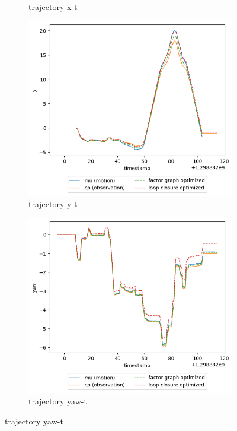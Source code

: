 \documentclass[conference]{IEEEtran}
\begin{document}
\begin{figure}
\begin{subfigure}{0.24\textwidth}
        \caption{trajectory x-t}
        \label{fig:trj_21_x}
    \end{subfigure}
    \hfill
    \begin{subfigure}{0.24\textwidth}
        \includegraphics[width=\linewidth]{../img/trj_21_y.png}
        \caption{trajectory y-t}
        \label{fig:trj_21_y}
    \end{subfigure}
    \hfill
    \begin{subfigure}{0.24\textwidth}
        \includegraphics[width=\linewidth]{../img/trj_21_yaw.png}
        \caption{trajectory yaw-t}
        \label{fig:trj_21_yaw}
    \end{subfigure}
    

\end{figure}
\end{document}
